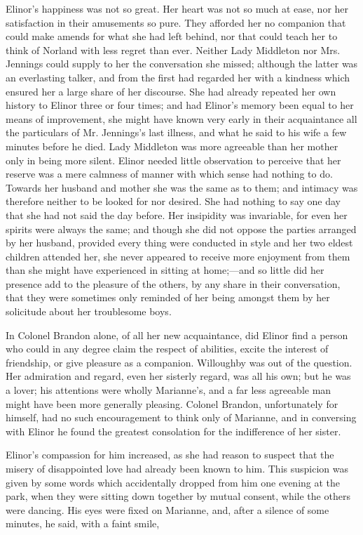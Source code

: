Elinor's happiness was not so great. Her heart was not so much at ease, nor her satisfaction in their amusements so pure. They afforded her no companion that could make amends for what she had left behind, nor that could teach her to think of Norland with less regret than ever. Neither Lady Middleton nor Mrs. Jennings could supply to her the conversation she missed; although the latter was an everlasting talker, and from the first had regarded her with a kindness which ensured her a large share of her discourse. She had already repeated her own history to Elinor three or four times; and had Elinor's memory been equal to her means of improvement, she might have known very early in their acquaintance all the particulars of Mr. Jennings's last illness, and what he said to his wife a few minutes before he died. Lady Middleton was more agreeable than her mother only in being more silent. Elinor needed little observation to perceive that her reserve was a mere calmness of manner with which sense had nothing to do. Towards her husband and mother she was the same as to them; and intimacy was therefore neither to be looked for nor desired. She had nothing to say one day that she had not said the day before. Her insipidity was invariable, for even her spirits were always the same; and though she did not oppose the parties arranged by her husband, provided every thing were conducted in style and her two eldest children attended her, she never appeared to receive more enjoyment from them than she might have experienced in sitting at home;---and so little did her presence add to the pleasure of the others, by any share in their conversation, that they were sometimes only reminded of her being amongst them by her solicitude about her troublesome boys.

In Colonel Brandon alone, of all her new acquaintance, did Elinor find a person who could in any degree claim the respect of abilities, excite the interest of friendship, or give pleasure as a companion. Willoughby was out of the question. Her admiration and regard, even her sisterly regard, was all his own; but he was a lover; his attentions were wholly Marianne's, and a far less agreeable man might have been more generally pleasing. Colonel Brandon, unfortunately for himself, had no such encouragement to think only of Marianne, and in conversing with Elinor he found the greatest consolation for the indifference of her sister.

Elinor's compassion for him increased, as she had reason to suspect that the misery of disappointed love had already been known to him. This suspicion was given by some words which accidentally dropped from him one evening at the park, when they were sitting down together by mutual consent, while the others were dancing. His eyes were fixed on Marianne, and, after a silence of some minutes, he said, with a faint smile, 

